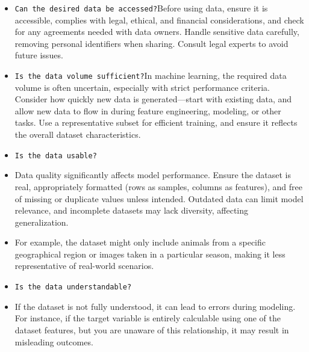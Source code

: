 \documentclass[serif, aspectratio=169]{beamer}
\begin{document}
\begin{frame}
    \begin{itemize}
        \item \texttt{\color{red}Can the desired data be accessed?}\newline Before using data, ensure it is accessible, complies with legal, ethical, and financial considerations, and check for any agreements needed with data owners. Handle sensitive data carefully, removing personal identifiers when sharing. Consult legal experts to avoid future issues.
        \item \texttt{\color{red}Is the data volume sufficient?}\newline In machine learning, the required data volume is often uncertain, especially with strict performance criteria. Consider how quickly new data is generated—start with existing data, and allow new data to flow in during feature engineering, modeling, or other tasks. Use a representative subset for efficient training, and ensure it reflects the overall dataset characteristics.
    \end{itemize}
\end{frame}

\begin{frame}
    \begin{itemize}
        \item \texttt{\color{red}Is the data usable?} 
        \item Data  quality significantly affects model performance. Ensure the dataset is real, appropriately formatted (rows as samples, columns as features), and free of missing or duplicate values unless intended. Outdated data can limit model relevance, and incomplete datasets may lack diversity, affecting generalization.
        \item For example, the dataset might only include animals from a specific geographical region or images taken in a particular season, making it less representative of real-world scenarios.
    \end{itemize}
\end{frame}

\begin{frame}
    \begin{itemize}
        \item \texttt{\color{red}Is the data understandable?} 
        \item If the dataset is not fully understood, it can lead to errors during modeling. For instance, if the target variable is entirely calculable using one of the dataset features, but you are unaware of this relationship, it may result in misleading outcomes.
    \end{itemize}
\end{frame}
\end{document}
